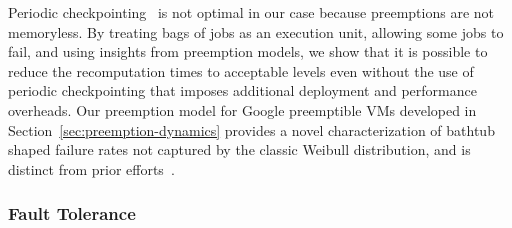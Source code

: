 Periodic checkpointing~\cite{dongarra_fault_nodate} is not optimal in our case because preemptions are not memoryless. 
By treating bags of jobs as an execution unit, allowing some jobs to fail, and using insights from preemption models, we show that it is possible to reduce the recomputation times to acceptable levels even without the  use of periodic  checkpointing that imposes additional deployment and performance overheads. 
Our preemption model for Google preemptible VMs developed in Section~\ref{sec:preemption-dynamics} provides a novel characterization of bathtub shaped failure rates not captured by the classic Weibull distribution, and is distinct from prior efforts~\cite{mudholkar1993exponentiated, crevecoeur1993model}. 



\subsubsection{Fault Tolerance}






